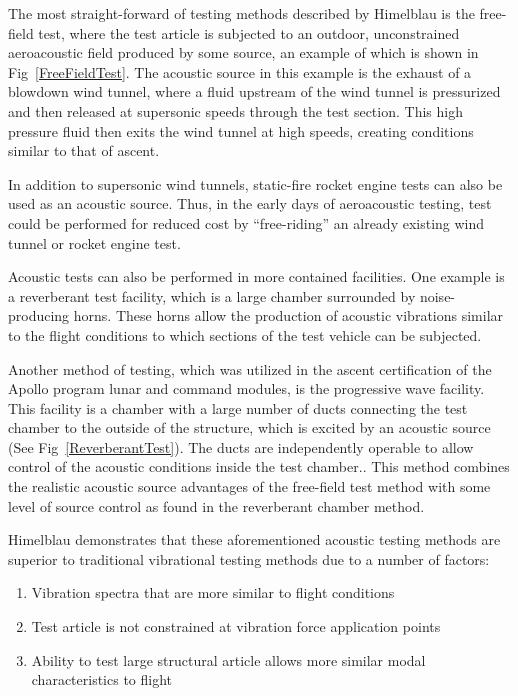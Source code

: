 \documentclass[]{aiaa-tc}%
\begin{document}
The most straight-forward of testing methods described by Himelblau is the free-field test, where the test article is subjected to an outdoor, unconstrained aeroacoustic field produced by some source, an example of which is shown in Fig~\ref{FreeFieldTest}.  The acoustic source in this example is the exhaust of a blowdown wind tunnel, where a fluid upstream of the wind tunnel is pressurized and then released at supersonic speeds through the test section.\cite{BlowdownWindTunnel}  This high pressure fluid then exits the wind tunnel at high speeds, creating conditions similar to that of ascent.



In addition to supersonic wind tunnels, static-fire rocket engine tests can also be used as an acoustic source.  Thus, in the early days of aeroacoustic testing, test could be performed for reduced cost by ``free-riding'' an already existing wind tunnel or rocket engine test.

Acoustic tests can also be performed in more contained facilities.  One example is a reverberant test facility, which is a large chamber surrounded by noise-producing horns.\cite{ReverberantChamber}  These horns allow the production of acoustic vibrations similar to the flight conditions to which sections of the test vehicle can be subjected.

Another method of testing, which was utilized in the ascent certification of the Apollo program lunar and command modules, is the progressive wave facility.  This facility is a chamber with a large number of ducts connecting the test chamber to the outside of the structure, which is excited by an acoustic source (See Fig~\ref{ReverberantTest}).  The ducts are independently operable to allow control of the acoustic conditions inside the test chamber.\cite{ProgressiveWaveChamber}.  This method combines the realistic acoustic source advantages of the free-field test method with some level of source control as found in the reverberant chamber method.





Himelblau demonstrates that these aforementioned acoustic testing methods are superior to traditional vibrational testing methods due to a number of factors:
\begin{enumerate}
  \item Vibration spectra that are more similar to flight conditions
  \item Test article is not constrained at vibration force application points
  \item Ability to test large structural article allows more similar modal characteristics to flight
\end{enumerate}
\end{document}
